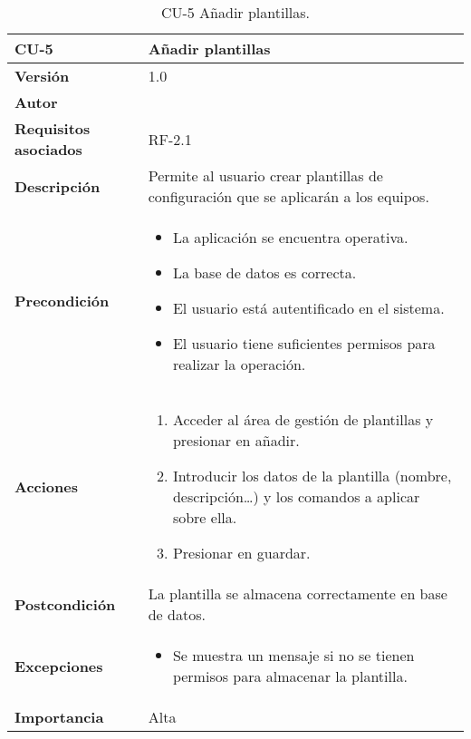 \begin{table}[p]
	\centering
	\begin{tabularx}{\linewidth}{ p{} p{} }
		\toprule
		\textbf{CU-5}    & \textbf{ Añadir plantillas}\\
		\toprule
		\textbf{Versión}              & 1.0    \\
		\textbf{Autor}                & \@author{} \\
		\textbf{Requisitos asociados} & RF-2.1\\
		\textbf{Descripción}          & Permite al usuario crear plantillas de configuración que se aplicarán a los equipos.\\
		\textbf{Precondición}         &
		\begin{itemize}
			\tightlist
			\item La aplicación se encuentra operativa.
			\item La base de datos es correcta.
			\item El usuario está autentificado en el sistema.
			\item El usuario tiene suficientes permisos para realizar la operación.
		\end{itemize}\\
		\textbf{Acciones}             &
		\begin{enumerate}
			\tightlist
			\item Acceder al área de gestión de plantillas y presionar en añadir.
			\item Introducir los datos de la plantilla (nombre, descripción\dots) y los comandos a aplicar sobre ella.
			\item Presionar en guardar.
		\end{enumerate}\\
		\textbf{Postcondición}        & La plantilla se almacena correctamente en base de datos.\\
		\textbf{Excepciones}          &
		\begin{itemize}
			\tightlist
			\item Se muestra un mensaje si no se tienen permisos para almacenar la plantilla.
		\end{itemize}\\
		\textbf{Importancia}          & Alta\\
		\bottomrule
	\end{tabularx}
	\caption{CU-5 Añadir plantillas.}\label{tab:table-5}
\end{table}

